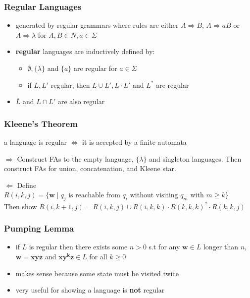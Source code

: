 \documentclass{beamer}
\begin{document}
\begin{frame}
  \frametitle{Regular Languages}
  \begin{itemize}
  \item generated by regular grammars where rules are either $A \Rightarrow B$,
    $A \Rightarrow aB$ or $A \Rightarrow \lambda$ for $A, B \in N, a \in \Sigma$
  \item \textbf{regular} languages are inductively defined by:
    \begin{itemize}
      \item $\emptyset, \{\lambda\}$ and $\{a\}$ are regular for $a \in \Sigma$
      \item if $L, L'$ regular, then $L \cup L', L \cdot L'$ and $L^*$ are
        regular
    \end{itemize}
   \item $\overline{L}$ and $L \cap L'$ are also regular
 \end{itemize}
\end{frame}


\begin{frame}
\frametitle{Kleene's Theorem}
\begin{theorem}
  a language is regular $\iff$ it is accepted by a finite automata
\end{theorem}
\begin{block}{$\Rightarrow$}
Construct FAs to the empty language, $\{\lambda\}$ and singleton
languages. Then construct FAs for union, concatenation, and Kleene star.
\end{block}

\begin{block}{$\Leftarrow$}
Define $R(i, k, j) = \{\mathbf{w} \; | \; q_j \text{ is reachable from } q_i
\text{ without visiting } q_m \text{ with } m \geq k\}$\\

Then show $R(i, k+1, j) = R(i, k, j) \cup R(i, k, k) \cdot R(k, k, k)^* \cdot
R(k, k, j)$
\end{block}
\end{frame}


\begin{frame}
\frametitle{Pumping Lemma}
\begin{itemize}
  \item if $L$ is regular then there exists some $n > 0$ s.t for any $\mathbf{w}
    \in L$ longer than $n$, $\mathbf{w} = \mathbf{xyz}$ and $\mathbf{xy^kz} \in
    L$ for all $k \geq 0$
  \item makes sense because some state must be visited twice
  \item very useful for showing a language is \textbf{not} regular
\end{itemize}
\end{frame}
\end{document}
